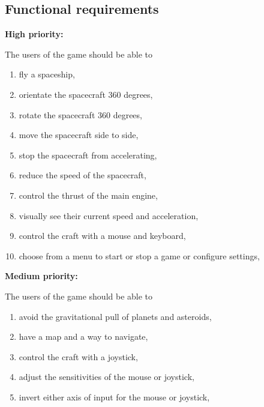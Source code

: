 \subsection*{Functional requirements}

\noindent \textbf{High priority:}

The users of the game should be able to

\begin{enumerate}

  \item fly a spaceship,

  \item orientate the spacecraft 360 degrees,

  \item rotate the spacecraft 360 degrees,

  \item move the spacecraft side to side,

  \item stop the spacecraft from accelerating, 
  
  \item reduce the speed of the spacecraft, 

  \item control the thrust of the main engine,

  \item visually see their current speed and acceleration,

  \item control the craft with a mouse and keyboard,

  \item choose from a menu to start or stop a game or configure settings,

\end{enumerate}

\noindent \textbf{Medium priority:}

The users of the game should be able to

\begin{enumerate}

  \item avoid the gravitational pull of planets and asteroids, 

  \item have a map and a way to navigate,

  \item control the craft with a joystick,

  \item adjust the sensitivities of the mouse or joystick,

  \item invert either axis of input for the mouse or joystick,

\end{enumerate}

